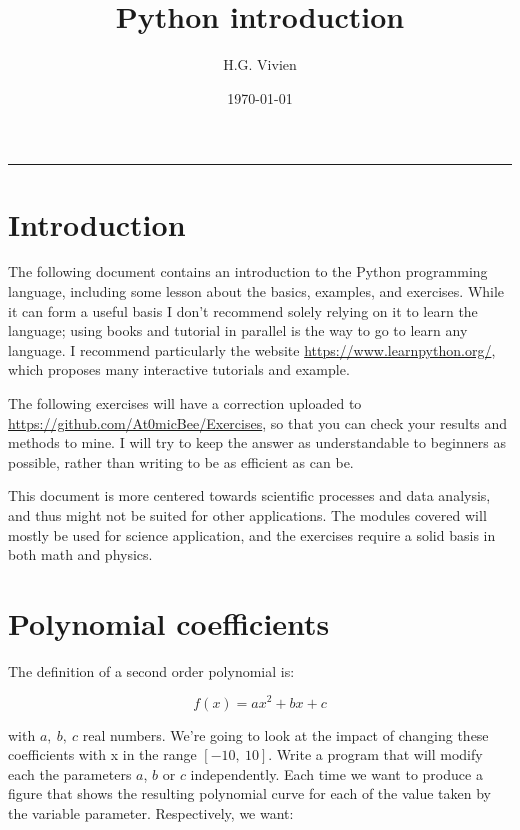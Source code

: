 \documentclass[twocolumn]{article}
\title{Python introduction}
\author[1]{H.G. Vivien}
\affil[1]{Laboratoire de Physique et Chimie de l'Environnement et de l'Espace (LPC2E), UMR CNRS 7328 - Université d'Orl\'eans, Orl\'eans, France}
\date{\today}
\begin{document}

\onecolumn

\maketitle
\hrule

\section*{Introduction}

The following document contains an introduction to the Python programming language, including some lesson about the basics, examples, and exercises. While it can form a useful basis I don't recommend solely relying on it to learn the language; using books and tutorial in parallel is the way to go to learn any language. I recommend particularly the website \href{https://www.learnpython.org/}{https://www.learnpython.org/}, which proposes many interactive tutorials and example.

The following exercises will have a correction uploaded to \href{https://github.com/At0micBee/Exercises}{https://github.com/At0micBee/Exercises}, so that you can check your results and methods to mine. I will try to keep the answer as understandable to beginners as possible, rather than writing to be as efficient as can be.

This document is more centered towards scientific processes and data analysis, and thus might not be suited for other applications. The modules covered will mostly be used for science application, and the exercises require a solid basis in both math and physics. 

\twocolumn


\section{Polynomial coefficients}\label{sec:polynomial_coefficients}

The definition of a second order polynomial is:

\begin{equation}\label{eq:poly}
    f(x) = ax^2 + bx + c
\end{equation}

with $a,~b,~c$ real numbers. We're going to look at the impact of changing these coefficients with x in the range $[-10,~10]$. Write a program that will modify each the parameters $a$, $b$ or $c$ independently. Each time we want to produce a figure that shows the resulting polynomial curve for each of the value taken by the variable parameter. Respectively, we want:
\end{document}
